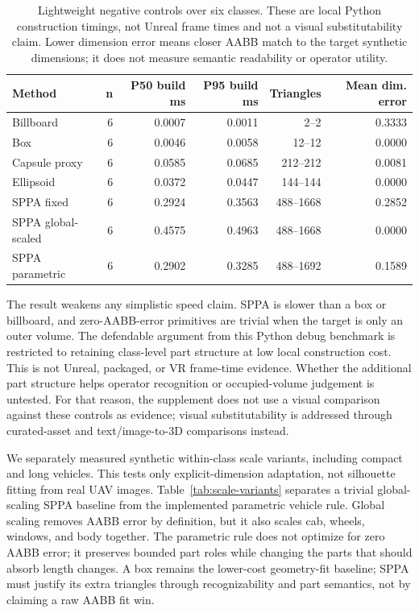 ﻿\documentclass[11pt,a4paper]{article}
\begin{document}
\begin{table}[h]
\centering
\scriptsize
\setlength{\tabcolsep}{3pt}
\caption{Lightweight negative controls over six classes. These are local Python
construction timings, not Unreal frame times and not a visual substitutability
claim. Lower dimension error means closer AABB match to the target synthetic
dimensions; it does not measure semantic readability or operator utility.}
\label{tab:lightweight-negative-controls}
\begin{tabular}{@{}lrrrrr@{}}
\toprule
Method & n & P50 build ms & P95 build ms & Triangles & Mean dim. error \\
\midrule
Billboard & 6 & 0.0007 & 0.0011 & 2--2 & 0.3333 \\
Box & 6 & 0.0046 & 0.0058 & 12--12 & 0.0000 \\
Capsule proxy & 6 & 0.0585 & 0.0685 & 212--212 & 0.0081 \\
Ellipsoid & 6 & 0.0372 & 0.0447 & 144--144 & 0.0000 \\
SPPA fixed & 6 & 0.2924 & 0.3563 & 488--1668 & 0.2852 \\
SPPA global-scaled & 6 & 0.4575 & 0.4963 & 488--1668 & 0.0000 \\
SPPA parametric & 6 & 0.2902 & 0.3285 & 488--1692 & 0.1589 \\
\bottomrule
\end{tabular}
\end{table}

The result weakens any simplistic speed claim. SPPA is slower than a box or
billboard, and zero-AABB-error primitives are trivial when the target is only an
outer volume. The defendable argument from this Python debug benchmark is
restricted to retaining class-level part structure at low local construction
cost. This is not Unreal, packaged, or VR frame-time evidence. Whether the
additional part structure helps operator recognition or occupied-volume
judgement is untested. For that reason, the supplement does
not use a visual comparison against these controls as evidence; visual
substitutability is addressed through curated-asset and text/image-to-3D
comparisons instead.

We separately measured synthetic within-class scale variants, including compact
and long vehicles. This tests only explicit-dimension adaptation, not silhouette
fitting from real UAV images. Table~\ref{tab:scale-variants} separates a
trivial global-scaling SPPA baseline from the implemented parametric vehicle
rule. Global scaling removes AABB error by definition, but it also scales cab,
wheels, windows, and body together. The
parametric rule does not optimize for zero AABB error; it preserves bounded part
roles while changing the parts that should absorb length changes. A box remains
the lower-cost geometry-fit baseline; SPPA must justify its extra triangles
through recognizability and part semantics, not by claiming a raw AABB fit win.
\end{document}

